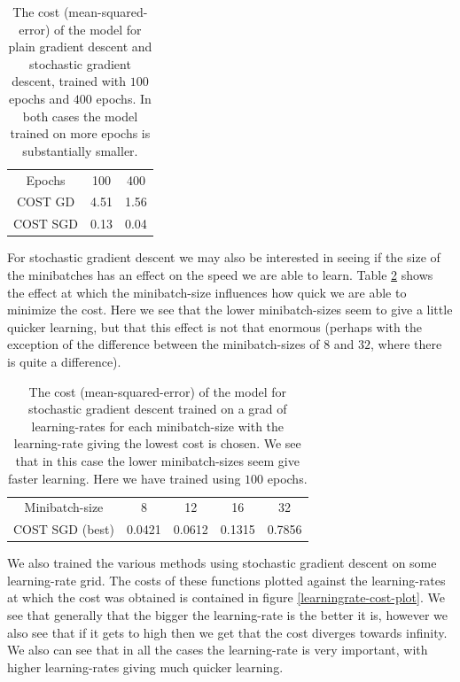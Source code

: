 \documentclass{article}
\begin{document}
\begin{table}
      \centering
      \begin{tabular}{| c | c | c |}
            Epochs   & 100  & 400  \\
            COST GD  & 4.51 & 1.56 \\
            COST SGD & 0.13 & 0.04
      \end{tabular}
      \caption{The cost (mean-squared-error) of the model for plain gradient
            descent and stochastic gradient descent, trained with $100$ epochs and
            $400$ epochs. In both cases the model trained on more epochs is
            substantially smaller.}
      \label{epochs-varying}
\end{table}

For stochastic gradient descent we may also be interested in seeing if the size
of the minibatches has an effect on the speed we are able to learn. Table
\ref{minibatchsize-varying} shows the effect at which the minibatch-size
influences how quick we are able to minimize the cost. Here we see that the
lower minibatch-sizes seem to give a little quicker learning, but that  this
effect is not that enormous (perhaps with the exception of the difference
between the minibatch-sizes of $8$ and $32$, where there is quite a difference).

\begin{table}
      \centering
      \begin{tabular}{| c | c | c | c | c |}
            Minibatch-size  & 8      & 12     & 16     & 32     \\
            COST SGD (best) & 0.0421 & 0.0612 & 0.1315 & 0.7856
      \end{tabular}
      \caption{The cost (mean-squared-error) of the model for stochastic
            gradient descent trained on a grad of learning-rates for each
            minibatch-size with the learning-rate giving the lowest cost is chosen. We
            see that in this case the lower minibatch-sizes seem give faster
            learning. Here we have trained using $100$ epochs.}
      \label{minibatchsize-varying}
\end{table}

We also trained the various methods using stochastic gradient descent on some
learning-rate grid. The costs of these functions plotted against the
learning-rates at which the cost was obtained is contained in figure
\ref{learningrate-cost-plot}. We see that generally that the bigger the
learning-rate is the better it is, however we also see that if it gets to high
then we get that the cost diverges towards infinity. We also can see that in all
the cases the learning-rate is very important, with higher learning-rates giving
much quicker learning.
\end{document}
